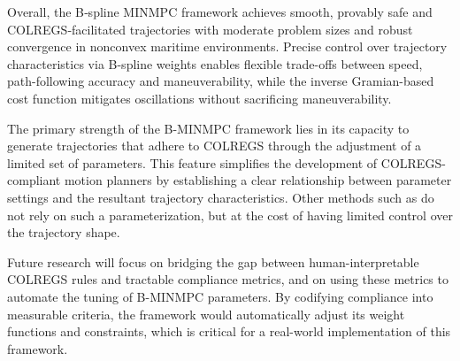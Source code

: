 Overall, the B‐spline MINMPC framework achieves smooth, provably safe and COLREGS‐facilitated trajectories with moderate problem sizes and robust convergence in nonconvex maritime environments. Precise control over trajectory characteristics via B-spline weights enables flexible trade-offs between speed, path-following accuracy and maneuverability, while the inverse Gramian-based cost function mitigates oscillations without sacrificing maneuverability.

The primary strength of the B-MINMPC framework lies in its capacity to generate trajectories that adhere to COLREGS through the adjustment of a limited set of parameters. This feature simplifies the development of COLREGS-compliant motion planners by establishing a clear relationship between parameter settings and the resultant trajectory characteristics. Other methods such as \citet{Hagen2018,cho2021colreg,Menges2024} do not rely on such a parameterization, but at the cost of having limited control over the trajectory shape.

Future research will focus on bridging the gap between human-interpretable COLREGS rules and tractable compliance metrics, and on using these metrics to automate the tuning of B-MINMPC parameters. By codifying compliance into measurable criteria, the framework would automatically adjust its weight functions and constraints, which is critical for a real-world implementation of this framework.